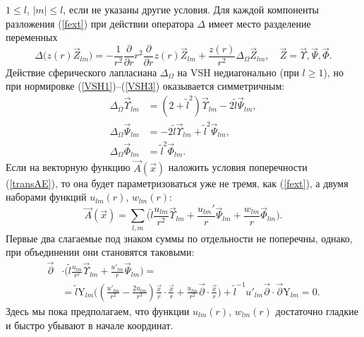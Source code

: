 \documentclass[12pt]{article}
\newcommand{\pl}{\partial}
\newcommand{\plr}{\partial r}
\newcommand{\Dtph}{\Delta_{\Omega}}
\newcommand{\YY}{\mathrm{Y}}
\begin{document}
$ 1 \leq l $, 
$ |m| \leq l $,
    если не указаны другие условия.
    Для каждой компоненты разложения
(\ref{fext})
    при действии оператора
$ \Delta $
    имеет место разделение переменных
\begin{equation*}
    \Delta \bigl(z(r) \vec{Z}_{lm}\bigr) =
-\frac{1}{r^{2}} \frac{\pl}{\plr} r^{2} \frac{\pl}{\plr} z(r) \vec{Z}_{lm}
        + \frac{z(r)}{r^{2}} \Dtph \vec{Z}_{lm}, \quad
            \vec{Z} = \vec{\Upsilon}, \vec{\Psi}, \vec{\Phi} .
\end{equation*}
    Действие сферического лапласиана
$ \Dtph $
    на VSH недиагонально (при
$ l \geq 1 $), но при нормировке
(\ref{VSH1})--(\ref{VSH3})
    оказывается симметричным:
\begin{align*}
    \Dtph \vec{\Upsilon}_{lm} &= (2+\tilde{l}^{2}) \vec{\Upsilon}_{lm}
            - 2 \tilde{l} \vec{\Psi}_{lm} ,\\
                  \Dtph \vec{\Psi}_{lm} &= -2 \tilde{l}
\vec{\Upsilon}_{lm}
            + \tilde{l}^{2} \vec{\Psi}_{lm} ,\\
    \Dtph \vec{\Phi}_{lm} &= \tilde{l}^{2} \vec{\Phi}_{lm} .
\end{align*}
    Если на векторную функцию
$ \vec{A}(\vec{x}) $
    наложить условия поперечности
(\ref{transAE}),
    то она будет параметризоваться уже не тремя, как
(\ref{fext}),
    а двумя наборами функций
$ u_{lm}(r) $,
$ w_{lm}(r) $:
\begin{equation}
\label{Atrexp}
    \vec{A}(\vec{x}) =
        \sum_{l,m} \bigl(\tilde{l}
	    \frac{u_{lm}}{r^{2}} \vec{\Upsilon}_{lm} +
        \frac{u_{lm}'}{r} \vec{\Psi}_{lm} 
    +   \frac{w_{lm}}{r} \vec{\Phi}_{lm} \bigr) .
\end{equation}
    Первые два слагаемые под знаком суммы по отдельности не поперечны, однако,
    при объединении они становятся таковыми:
\begin{align}
\label{treq}
    \vec{\pl} &\cdot
\bigl(\tilde{l}\frac{u_{lm}}{r^{2}}\vec{\Upsilon}_{lm}
        +\frac{u'_{lm}}{r}\vec{\Psi}_{lm}\bigr) =\\
\nonumber
    &= \tilde{l} \YY_{lm}
        \bigl( (\frac{u'_{lm}}{r^{2}}-\frac{2u_{lm}}{r^{3}})
        \frac{\vec{x}}{r}\cdot\frac{\vec{x}}{r} 
    + \frac{u_{lm}}{r^{2}} \vec{\pl}\cdot \frac{\vec{x}}{r} \bigr) 
    + \tilde{l}^{-1} u'_{lm} \vec{\pl}\cdot\vec{\pl} \YY_{lm} = 0 .
\end{align}
    Здесь мы пока предполагаем, что функции
$ u_{lm}(r) $,
$ w_{lm}(r) $
    достаточно гладкие и быстро убывают в начале координат.
\end{document}
